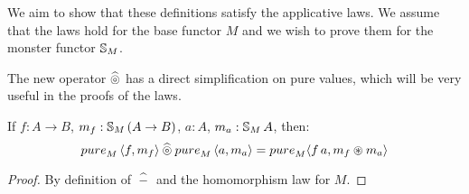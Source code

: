We aim to show that these definitions satisfy the applicative laws.
We assume that the laws hold for the base functor $M$ and we wish to prove them for the monster functor $\mathbb{S}_{M}$.

The new operator $\mathbin{\widehat{\circledcirc}}$ has a direct simplification on pure values, which will be very useful in the proofs of the laws.
\begin{lemma}\label{lemma:pappl}
If $f:A\rightarrow B$, $m_f:\mathbb{S}_{M}\,(A\rightarrow B)$, $a:A$, $m_a:\mathbb{S}_{M}\,A$, then:
$$
\apure_M\,\langle f, m_f\rangle \alift{\pappl} \apure_M\,\langle a, m_a\rangle = \apure_M \langle f\,a, m_f \appl m_a \rangle
$$
\end{lemma}
\begin{proof}
By definition of ${}\mathbin{\widehat{-}}{}$ and the homomorphism law for $M$.
\end{proof}

